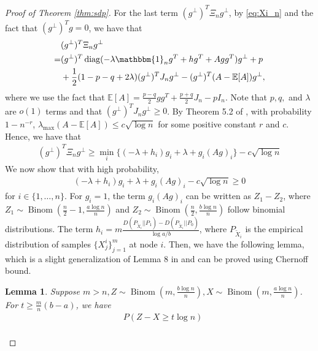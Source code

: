 \documentclass[conference]{IEEEtran}
\newtheorem{lemma}{Lemma}
\DeclareMathOperator{\diag}{diag}
\DeclareMathOperator{\Binom}{Binom}
\begin{document}
\begin{proof}[Proof of Theorem \ref{thm:sdp}]
 
	
	
	
	
	
	
	For the last term $(g^{\perp})^T \Xi_n g^{\perp}$, by \eqref{eq:Xi_n} and the fact that $(g^{\perp})^Tg=0$, we have that
	\begin{align*}
		&(g^{\perp})^T \Xi_n g^{\perp} \\
		=& (g^{\perp})^T \diag( -\lambda \mathbbm{1}_ng^T+hg^T + Agg^T) g^{\perp} + p \\
		&+ \frac{1}{2}(1-p-q+2\lambda)(g^{\perp})^TJ_n g^{\perp}
		-(g^{\perp})^T(A-\mathbb{E}[A])g^{\perp},
	\end{align*}
	where we use the fact that $\mathbb{E}[A] = \frac{p-q}{2}gg^T + \frac{p+q}{2}J_n - pI_n$. Note that $p,q,$ and $\lambda$ are $o(1)$ terms and that $(g^{\perp})^TJ_n g^{\perp}\ge 0$. 
	By Theorem 5.2 of \cite{lei2015consistency},
	with probability $1-n^{-r}$, $\lambda_{\max}(A-\mathbb{E}[A]) \leq c\sqrt{\log n}$ for some positive constant $r$ and $c$. Hence, we have that
	\begin{align}\label{eq:lastterm}
		(g^{\perp})^T \Xi_n g^{\perp} \geq \min_i\{(-\lambda + h_i) g_i+\lambda + g_i (Ag)_i \} - c \sqrt{\log n}
	\end{align}
	We now show that with high probability,
	\begin{align}\label{eq:nodei}
		(-\lambda + h_i) g_i+\lambda + g_i (Ag)_i  - c \sqrt{\log n}\ge 0
	\end{align}
	for $i\in\{1,\ldots,n\}$. For $g_i=1$,
	the term $g_i(Ag)_i$ can be written as 
	$Z_1-Z_2$, where $Z_1\sim \Binom(\frac{n}{2}-1,\frac{a\log n}{n})$
	and $Z_2\sim \Binom(\frac{n}{2},\frac{b\log n}{n})$ 
	follow binomial distributions. The term $h_i=m \frac{D(P_{\widetilde{X}_i} || P_1) - D(P_{\widetilde{X}_i} || P_0) }{\log a /b}$, where $P_{\widetilde{X}_i}$ is the empirical distribution of samples $\{X^i_j\}^m_{j=1}$ at node $i$. Then, we have the following lemma, which is a slight generalization of Lemma 8 in \cite{abbe2015exact} and can be proved using Chernoff bound.
	\begin{lemma}\label{lem:zxt}
		Suppose $m > n, Z \sim \Binom(m, \frac{b\log n}{n}), X\sim \Binom(m, \frac{a\log n}{n})$.
		For $ t \geq \frac{m}{n}(b - a)$, we have
		\begin{align}\label{eq:estimation}
			&P(Z - X \geq t \log n) \nonumber\\

\end{align}
\end{lemma}
\end{proof}
\end{document}

